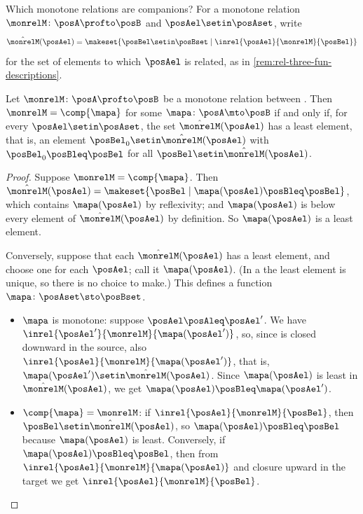 Which monotone relations are companions?
For a monotone relation $\monrelM \colon \posA \profto \posB$ and $\posAel \setin \posAset$, write
\begin{equation}
    \hat{\monrelM}(\posAel) = \makeset{\posBel \setin \posBset \mid \inrel{\posAel}{\monrelM}{\posBel}}
\end{equation}
for the set of elements to which $\posAel$ is related, as in \cref{rem:rel-three-fun-descriptions}.

\begin{lemma}
    \label{lem:which-monrels-are-companions}
    Let $\monrelM \colon \posA \profto \posB$ be a monotone relation between .
    Then $\monrelM = \comp{\mapa}$ for some  $\mapa \colon \posA \mto \posB$ if and only if, for every $\posAel \setin \posAset$, the set $\hat{\monrelM}(\posAel)$ has a least element, that is, an element $\posBel_0 \setin \hat{\monrelM}(\posAel)$ with $\posBel_0 \posBleq \posBel$ for all $\posBel \setin \hat{\monrelM}(\posAel)$.
\end{lemma}
\begin{proof}
    Suppose $\monrelM = \comp{\mapa}$.
    Then $\hat{\monrelM}(\posAel) = \makeset{\posBel \mid \mapa(\posAel) \posBleq \posBel}$, which contains $\mapa(\posAel)$ by reflexivity; and $\mapa(\posAel)$ is below every element of $\hat{\monrelM}(\posAel)$ by definition.
    So $\mapa(\posAel)$ is a least element.

    Conversely, suppose that each $\hat{\monrelM}(\posAel)$ has a least element, and choose one for each $\posAel$; call it $\mapa(\posAel)$.
    (In a  the least element is unique, so there is no choice to make.)
    This defines a function $\mapa \colon \posAset \sto \posBset$.
    \begin{itemize}
        \item $\mapa$ is monotone: suppose $\posAel \posAleq \posAel'$.
              We have $\inrel{\posAel'}{\monrelM}{\mapa(\posAel')}$, so, since \monrelM is closed downward in the source, also $\inrel{\posAel}{\monrelM}{\mapa(\posAel')}$, that is, $\mapa(\posAel') \setin \hat{\monrelM}(\posAel)$.
              Since $\mapa(\posAel)$ is least in $\hat{\monrelM}(\posAel)$, we get $\mapa(\posAel) \posBleq \mapa(\posAel')$.
        \item $\comp{\mapa} = \monrelM$: if $\inrel{\posAel}{\monrelM}{\posBel}$, then $\posBel \setin \hat{\monrelM}(\posAel)$, so $\mapa(\posAel) \posBleq \posBel$ because $\mapa(\posAel)$ is least.
              Conversely, if $\mapa(\posAel) \posBleq \posBel$, then from $\inrel{\posAel}{\monrelM}{\mapa(\posAel)}$ and closure upward in the target we get $\inrel{\posAel}{\monrelM}{\posBel}$.
    \end{itemize}
\end{proof}

